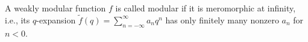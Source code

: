 A weakly modular function $f$ is called modular if it is meromorphic at infinity, i.e., its $q$-expansion $\tilde{f}(q) = \sum_{n=-\infty}^{\infty} a_n q^n$ has only finitely many nonzero $a_n$ for $n < 0$.
